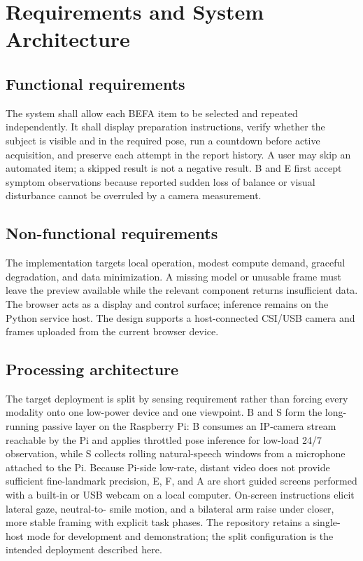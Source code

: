 \documentclass[11pt,a4paper]{article}
\begin{document}
\section{Requirements and System Architecture}

\subsection{Functional requirements}

The system shall allow each BEFA item to be selected and repeated independently. It shall display preparation instructions, verify whether the subject is visible and in the required pose, run a countdown before active acquisition, and preserve each attempt in the report history. A user may skip an automated item; a skipped result is not a negative result. B and E first accept symptom observations because reported sudden loss of balance or visual disturbance cannot be overruled by a camera measurement.

\subsection{Non-functional requirements}

The implementation targets local operation, modest compute demand, graceful degradation, and data minimization. A missing model or unusable frame must leave the preview available while the relevant component returns insufficient data. The browser acts as a display and control surface; inference remains on the Python service host. The design supports a host-connected CSI/USB camera and frames uploaded from the current browser device.

\subsection{Processing architecture}

The target deployment is split by sensing requirement rather than forcing every
modality onto one low-power device and one viewpoint. B and S form the long-running
passive layer on the Raspberry Pi: B consumes an IP-camera stream reachable by the
Pi and applies throttled pose inference for low-load 24/7 observation, while S
collects rolling natural-speech windows from a microphone attached to the Pi.
Because Pi-side low-rate, distant video does not provide sufficient fine-landmark
precision, E, F, and A are short guided screens performed with a built-in or USB
webcam on a local computer. On-screen instructions elicit lateral gaze, neutral-to-
smile motion, and a bilateral arm raise under closer, more stable framing with
explicit task phases. The repository retains a single-host mode for development
and demonstration; the split configuration is the intended deployment described
here.
\end{document}
